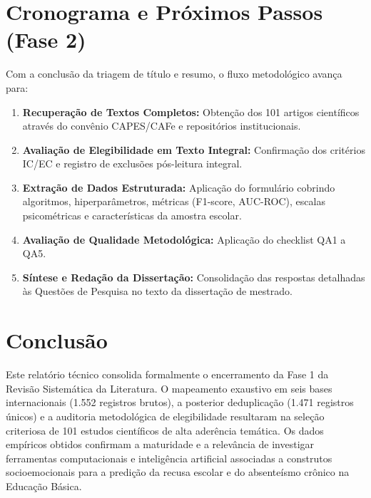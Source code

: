 \documentclass[journal,10pt,a4paper]{IEEEtran}
\begin{document}
\section{Cronograma e Próximos Passos (Fase 2)}
Com a conclusão da triagem de título e resumo, o fluxo metodológico avança para:
\begin{enumerate}
    \item \textbf{Recuperação de Textos Completos:} Obtenção dos 101 artigos científicos através do convênio CAPES/CAFe e repositórios institucionais.
    \item \textbf{Avaliação de Elegibilidade em Texto Integral:} Confirmação dos critérios IC/EC e registro de exclusões pós-leitura integral.
    \item \textbf{Extração de Dados Estruturada:} Aplicação do formulário cobrindo algoritmos, hiperparâmetros, métricas (F1-score, AUC-ROC), escalas psicométricas e características da amostra escolar.
    \item \textbf{Avaliação de Qualidade Metodológica:} Aplicação do checklist QA1 a QA5.
    \item \textbf{Síntese e Redação da Dissertação:} Consolidação das respostas detalhadas às Questões de Pesquisa no texto da dissertação de mestrado.
\end{enumerate}

\section{Conclusão}
Este relatório técnico consolida formalmente o encerramento da Fase 1 da Revisão Sistemática da Literatura. O mapeamento exaustivo em seis bases internacionais (1.552 registros brutos), a posterior deduplicação (1.471 registros únicos) e a auditoria metodológica de elegibilidade resultaram na seleção criteriosa de 101 estudos científicos de alta aderência temática. Os dados empíricos obtidos confirmam a maturidade e a relevância de investigar ferramentas computacionais e inteligência artificial associadas a construtos socioemocionais para a predição da recusa escolar e do absenteísmo crônico na Educação Básica.
\end{document}
